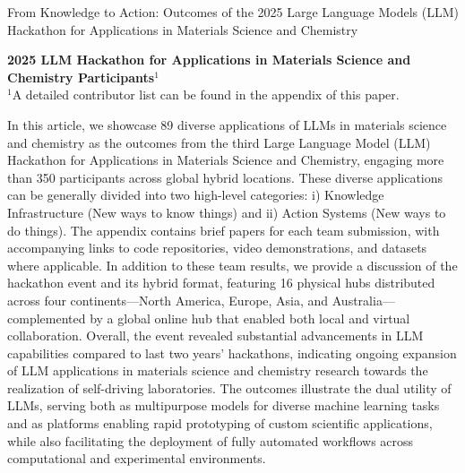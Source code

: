 \documentclass{article}
\begin{document}
\begin{tcolorbox}[
    enhanced,
    colback=mytheme,    %
    colframe=mytheme,   %
    arc=3mm,            %
    boxrule=0pt,        %
    left=15pt,          %
    right=15pt,
    top=12pt,
    bottom=12pt
]
    \begin{minipage}{\linewidth}
    \centering
    {\par
    \fontsize{20pt}{22pt}\selectfont
    \selectfont
    From Knowledge to Action: Outcomes of the 2025 Large Language Models (LLM) Hackathon for Applications in Materials Science and Chemistry
    \par}

    \vspace{15pt}

    {\large\textbf{
    2025 LLM Hackathon for Applications in Materials Science and Chemistry Participants$^1$}}\\
    {\normalsize $^1$A detailed contributor list can be found in the appendix of this paper.}
    
\end{minipage}

\vspace{10pt}
    In this article, we showcase 89 diverse applications of LLMs in materials science and chemistry as the outcomes from the third Large Language Model (LLM) Hackathon for Applications in Materials Science and Chemistry, engaging more than 350 participants across global hybrid locations. These diverse applications can be generally divided into two high-level categories: i) Knowledge Infrastructure (New ways to know things) and ii) Action Systems (New ways to do things). The appendix contains brief papers for each team submission, with accompanying links to code repositories, video demonstrations, and datasets where applicable. In addition to these team results, we provide a discussion of the hackathon event and its hybrid format, featuring 16 physical hubs distributed across four continents—North America, Europe, Asia, and Australia—complemented by a global online hub that enabled both local and virtual collaboration. Overall, the event revealed substantial advancements in LLM capabilities compared to last two years' hackathons, indicating ongoing expansion of LLM applications in materials science and chemistry research towards the realization of self-driving laboratories. The outcomes illustrate the dual utility of LLMs, serving both as multipurpose models for diverse machine learning tasks and as platforms enabling rapid prototyping of custom scientific applications, while also facilitating the deployment of fully automated workflows across computational and experimental environments. 
\end{tcolorbox}
\end{document}
